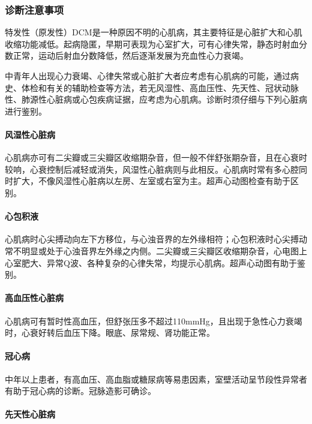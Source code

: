 \subsubsection{诊断注意事项}

特发性（原发性）DCM是一种原因不明的心肌病，其主要特征是心脏扩大和心肌收缩功能减低。起病隐匿，早期可表现为心室扩大，可有心律失常，静态时射血分数正常，运动后射血分数降低，然后逐渐发展为充血性心力衰竭。

中青年人出现心力衰竭、心律失常或心脏扩大者应考虑有心肌病的可能，通过病史、体检和有关的辅助检查等方法，若无风湿性、高血压性、先天性、冠状动脉性、肺源性心脏病或心包疾病证据，应考虑为心肌病。诊断时须仔细与下列心脏病进行鉴别。

\paragraph{风湿性心脏病}

心肌病亦可有二尖瓣或三尖瓣区收缩期杂音，但一般不伴舒张期杂音，且在心衰时较响，心衰控制后减轻或消失，风湿性心脏病则与此相反。心肌病时常有多心腔同时扩大，不像风湿性心脏病以左房、左室或右室为主。超声心动图检查有助于区别。

\paragraph{心包积液}

心肌病时心尖搏动向左下方移位，与心浊音界的左外缘相符；心包积液时心尖搏动常不明显或处于心浊音界左外缘之内侧。二尖瓣或三尖瓣区收缩期杂音，心电图上心室肥大、异常Q波、各种复杂的心律失常，均提示心肌病。超声心动图有助于鉴别。

\paragraph{高血压性心脏病}

心肌病可有暂时性高血压，但舒张压多不超过110mmHg，且出现于急性心力衰竭时，心衰好转后血压下降。眼底、尿常规、肾功能正常。

\paragraph{冠心病}

中年以上患者，有高血压、高血脂或糖尿病等易患因素，室壁活动呈节段性异常者有助于冠心病的诊断。冠脉造影可确诊。

\paragraph{先天性心脏病}

